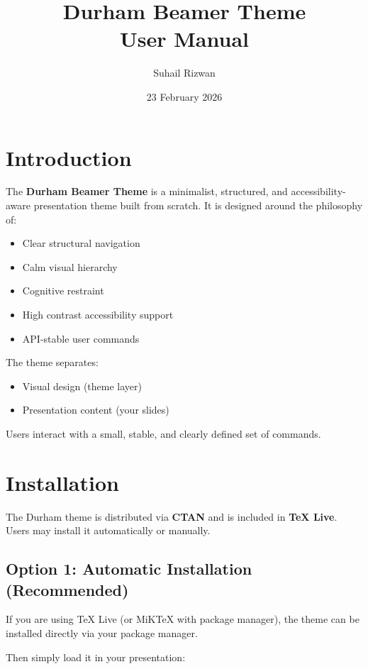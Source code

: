 \documentclass[11pt]{article}
\title{\textbf{Durham Beamer Theme}\\User Manual}
\author{Suhail Rizwan}
\date{23 February 2026}
\begin{document}
\maketitle
\tableofcontents
\newpage

\section{Introduction}

The \textbf{Durham Beamer Theme} is a minimalist, structured, and accessibility-aware presentation theme built from scratch. It is designed around the philosophy of:

\begin{itemize}
\item Clear structural navigation
\item Calm visual hierarchy
\item Cognitive restraint
\item High contrast accessibility support
\item API-stable user commands
\end{itemize}

The theme separates:
\begin{itemize}
\item Visual design (theme layer)
\item Presentation content (your slides)
\end{itemize}

Users interact with a small, stable, and clearly defined set of commands.

\section{Installation}

The Durham theme is distributed via \textbf{CTAN} and is included in \textbf{TeX Live}. 
Users may install it automatically or manually.

\subsection*{Option 1: Automatic Installation (Recommended)}

If you are using TeX Live (or MiKTeX with package manager), the theme can be installed directly via your package manager.

Then simply load it in your presentation:
\end{document}
